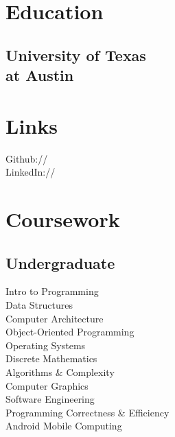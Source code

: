 \documentclass[]{deedy-resume-openfont}
\begin{document}

%
%

\begin{minipage}[t]{0.33\textwidth} 


\section{Education} 

\subsection{University of Texas\\ at Austin}
\sectionsep


\section{Links} 
Github:// \href{https://github.com/AndrewDang-Tran}{} \\
LinkedIn://  \href{https://www.linkedin.com/in/andrew-dang-tran-a57144bb}{} \\
\sectionsep


\section{Coursework}
\subsection{Undergraduate}
Intro to Programming \\
Data Structures \\
Computer Architecture \\
Object-Oriented Programming \\
Operating Systems \\
Discrete Mathematics \\
Algorithms \& Complexity \\
Computer Graphics \\
Software Engineering \\
Programming Correctness \& Efficiency \\
Android Mobile Computing \\
\sectionsep


\end{minipage}
\end{document}
